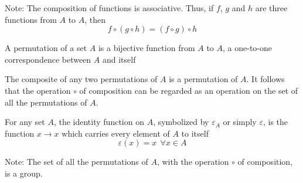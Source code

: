 \documentclass[12pt]{article}
\begin{document}
Note: The composition of functions is associative. Thus, if $f$, $g$ and $h$ are three functions from $A$ to $A$, then $$ f \circ (g \circ h) = (f \circ g) \circ h $$ 

\begin{definition} A permutation of a set $A$ is a bijective function from $A$ to $A$, a one-to-one correspondence between $A$ and itself \end{definition} 

\begin{definition} The composite of any two permutations of $A$ is a permutation of $A$. It follows that the operation $\circ$ of composition can be regarded as an operation on the set of all the permutations of $A$. \end{definition} 

\begin{definition} For any set $A$, the identity function on $A$, symbolized by $\varepsilon_A$ or simply $\varepsilon$, is the function $x \to x$ which carries every element of $A$ to itself 
$$\varepsilon(x) = x ~~ \forall x \in A $$ \end{definition} 

Note: The set of all the permutations of $A$, with the operation $\circ$ of composition, is a group. 
\end{document}
